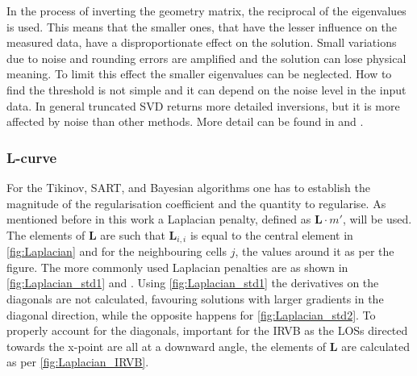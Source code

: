 In the process of inverting the geometry matrix, the reciprocal of the eigenvalues is used. This means that the smaller ones, that have the lesser influence on the measured data, have a disproportionate effect on the solution. Small variations due to noise and rounding errors are amplified and the solution can lose physical meaning. To limit this effect the smaller eigenvalues can be neglected. How to find the threshold is not simple and it can depend on the noise level in the input data. In general truncated SVD returns more detailed inversions, but it is more affected by noise than other methods. More detail can be found in \cite{Schou2015} and \cite{Widman2002}.

\subsubsection{L-curve}
For the Tikinov, SART, and Bayesian algorithms one has to establish the magnitude of the regularisation coefficient and the quantity to regularise. As mentioned before in this work a Laplacian penalty, defined as $\bm{L}\cdot m'$, will be used. The elements of $\bm{L}$ are such that $\bm{L}_{i,i}$ is equal to the central element in \autoref{fig:Laplacian} and for the neighbouring cells $j$, the values around it as per the figure. The more commonly used Laplacian penalties are as shown in \autoref{fig:Laplacian_std1} and .\cite{Fisher2004} Using \autoref{fig:Laplacian_std1} the derivatives on the diagonals are not calculated, favouring solutions with larger gradients in the diagonal direction, while the opposite happens for \autoref{fig:Laplacian_std2}. To properly account for the diagonals, important for the IRVB as the LOSs directed towards the x-point are all at a downward angle, the elements of $\bm{L}$ are calculated as per \autoref{fig:Laplacian_IRVB}.

